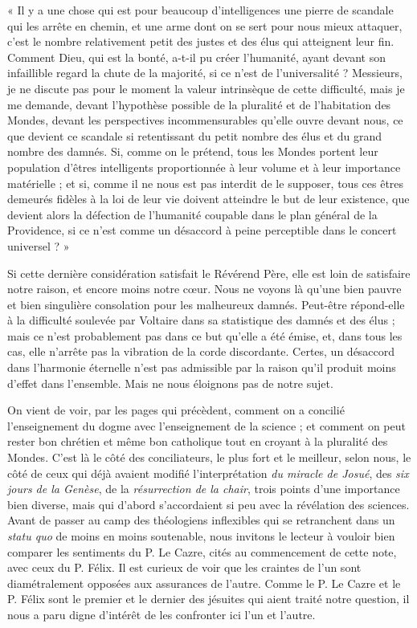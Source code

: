 \documentclass[a4paper, 11pt, oneside]{article}
\begin{document}
« Il y a une chose qui est pour beaucoup d'intelligences une pierre de scandale qui les arrête en chemin, et une arme dont on se sert pour nous mieux attaquer, c'est le nombre relativement petit des justes et des élus qui atteignent leur fin. Comment Dieu, qui est la bonté, a-t-il pu créer l'humanité, ayant devant son infaillible regard la chute de la majorité, si ce n'est de l'universalité ? Messieurs, je ne discute pas pour le moment la valeur intrinsèque de cette difficulté, mais je me demande, devant l'hypothèse possible de la pluralité et de l'habitation des Mondes, devant les perspectives incommensurables qu'elle ouvre devant nous, ce que devient ce scandale si retentissant du petit nombre des élus et du grand nombre des damnés. Si, comme on le prétend, tous les Mondes portent leur population d'êtres intelligents proportionnée à leur volume et à leur importance matérielle ; et si, comme il ne nous est pas interdit de le supposer, tous ces êtres demeurés fidèles à la loi de leur vie doivent atteindre le but de leur existence, que devient alors la défection de l'humanité coupable dans le plan général de la Providence, si ce n'est comme un désaccord à peine perceptible dans le concert universel ? »

Si cette dernière considération satisfait le Révérend Père, elle est loin de satisfaire notre raison, et encore moins notre cœur. Nous ne voyons là qu'une bien pauvre et bien singulière consolation pour les malheureux damnés. Peut-être répond-elle à la difficulté soulevée par Voltaire dans sa statistique des damnés et des élus ; mais ce n'est probablement pas dans ce but qu'elle a été émise, et, dans tous les cas, elle n'arrête pas la vibration de la corde discordante. Certes, un désaccord dans l'harmonie éternelle n'est pas admissible par la raison qu'il produit moins d'effet dans l'ensemble. Mais ne nous éloignons pas de notre sujet.

On vient de voir, par les pages qui précèdent, comment on a concilié l'enseignement du dogme avec l'enseignement de la science ; et comment on peut rester bon chrétien et même bon catholique tout en croyant à la pluralité des Mondes. C'est là le côté des conciliateurs, le plus fort et le meilleur, selon nous, le côté de ceux qui déjà avaient modifié l'interprétation \emph{du miracle de Josué}, des \emph{six jours de la Genèse}, de la \emph{résurrection de la chair}, trois points d'une importance bien diverse, mais qui d'abord s'accordaient si peu avec la révélation des sciences. Avant de passer au camp des théologiens inflexibles qui se retranchent dans un \emph{statu quo} de moins en moins soutenable, nous invitons le lecteur à vouloir bien comparer les sentiments du P. Le Cazre, cités au commencement de cette note, avec ceux du P. Félix. Il est curieux de voir que les craintes de l'un sont diamétralement opposées aux assurances de l'autre. Comme le P. Le Cazre et le P. Félix sont le premier et le dernier des jésuites qui aient traité notre question, il nous a paru digne d'intérêt de les confronter ici l'un et l'autre.
\end{document}

